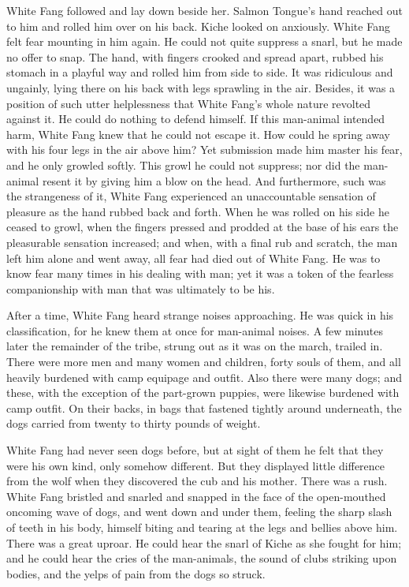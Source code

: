 \documentclass[10pt]{book}
\begin{document}
White Fang followed and lay down beside her. Salmon Tongue’s hand
reached out to him and rolled him over on his back. Kiche looked on
anxiously. White Fang felt fear mounting in him again. He could not
quite suppress a snarl, but he made no offer to snap. The hand, with
fingers crooked and spread apart, rubbed his stomach in a playful way
and rolled him from side to side. It was ridiculous and ungainly, lying
there on his back with legs sprawling in the air. Besides, it was a
position of such utter helplessness that White Fang’s whole nature
revolted against it. He could do nothing to defend himself. If this
man-animal intended harm, White Fang knew that he could not escape it.
How could he spring away with his four legs in the air above him? Yet
submission made him master his fear, and he only growled softly. This
growl he could not suppress; nor did the man-animal resent it by giving
him a blow on the head. And furthermore, such was the strangeness of
it, White Fang experienced an unaccountable sensation of pleasure as
the hand rubbed back and forth. When he was rolled on his side he
ceased to growl, when the fingers pressed and prodded at the base of
his ears the pleasurable sensation increased; and when, with a final
rub and scratch, the man left him alone and went away, all fear had
died out of White Fang. He was to know fear many times in his dealing
with man; yet it was a token of the fearless companionship with man
that was ultimately to be his.

After a time, White Fang heard strange noises approaching. He was quick
in his classification, for he knew them at once for man-animal noises.
A few minutes later the remainder of the tribe, strung out as it was on
the march, trailed in. There were more men and many women and children,
forty souls of them, and all heavily burdened with camp equipage and
outfit. Also there were many dogs; and these, with the exception of the
part-grown puppies, were likewise burdened with camp outfit. On their
backs, in bags that fastened tightly around underneath, the dogs
carried from twenty to thirty pounds of weight.

White Fang had never seen dogs before, but at sight of them he felt
that they were his own kind, only somehow different. But they displayed
little difference from the wolf when they discovered the cub and his
mother. There was a rush. White Fang bristled and snarled and snapped
in the face of the open-mouthed oncoming wave of dogs, and went down
and under them, feeling the sharp slash of teeth in his body, himself
biting and tearing at the legs and bellies above him. There was a great
uproar. He could hear the snarl of Kiche as she fought for him; and he
could hear the cries of the man-animals, the sound of clubs striking
upon bodies, and the yelps of pain from the dogs so struck.
\end{document}
